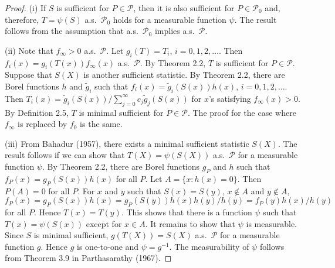 \documentclass{article}
\begin{document}
\begin{proof}
(i) If $S$ is sufficient for $P \in \mathcal{P}$, then it is also sufficient for $P \in \mathcal{P}_{0}$ and, therefore, $T = \psi(S)$ a.s.\ $\mathcal{P}_{0}$ holds for a measurable function $\psi$. The result follows from the assumption that a.s.\ $\mathcal{P}_{0}$ implies a.s.\ $\mathcal{P}$.

(ii) Note that $f_{\infty} > 0$ a.s.\ $\mathcal{P}$. Let $g_{i}(T) = T_{i}$, $i = 0, 1, 2, \ldots$. Then $f_{i}(x) = g_{i}(T(x)) f_{\infty}(x)$ a.s.\ $\mathcal{P}$. By Theorem 2.2, $T$ is sufficient for $P \in \mathcal{P}$. Suppose that $S(X)$ is another sufficient statistic. By Theorem 2.2, there are Borel functions $h$ and $\tilde{g}_{i}$ such that $f_{i}(x) = \tilde{g}_{i}(S(x)) h(x)$, $i = 0, 1, 2, \ldots$. Then $T_{i}(x) = \tilde{g}_{i}(S(x)) / \sum_{j=0}^{\infty} c_{j} \tilde{g}_{j}(S(x))$ for $x$'s satisfying $f_{\infty}(x) > 0$. By Definition 2.5, $T$ is minimal sufficient for $P \in \mathcal{P}$. The proof for the case where $f_{\infty}$ is replaced by $f_{0}$ is the same.

(iii) From Bahadur (1957), there exists a minimal sufficient statistic $S(X)$. The result follows if we can show that $T(X) = \psi(S(X))$ a.s.\ $\mathcal{P}$ for a measurable function $\psi$. By Theorem 2.2, there are Borel functions $g_{P}$ and $h$ such that $f_{P}(x) = g_{P}(S(x)) h(x)$ for all $P$. Let $A = \{x : h(x) = 0\}$. Then $P(A) = 0$ for all $P$. For $x$ and $y$ such that $S(x) = S(y)$, $x \notin A$ and $y \notin A$,
\[
f_{P}(x) = g_{P}(S(x)) h(x) = g_{P}(S(y)) h(x) h(y) / h(y) = f_{P}(y) h(x) / h(y)
\]
for all $P$. Hence $T(x) = T(y)$. This shows that there is a function $\psi$ such that $T(x) = \psi(S(x))$ except for $x \in A$. It remains to show that $\psi$ is measurable. Since $S$ is minimal sufficient, $g(T(X)) = S(X)$ a.s.\ $\mathcal{P}$ for a measurable function $g$. Hence $g$ is one-to-one and $\psi = g^{-1}$. The measurability of $\psi$ follows from Theorem 3.9 in Parthasarathy (1967).
\end{proof}
\end{document}
